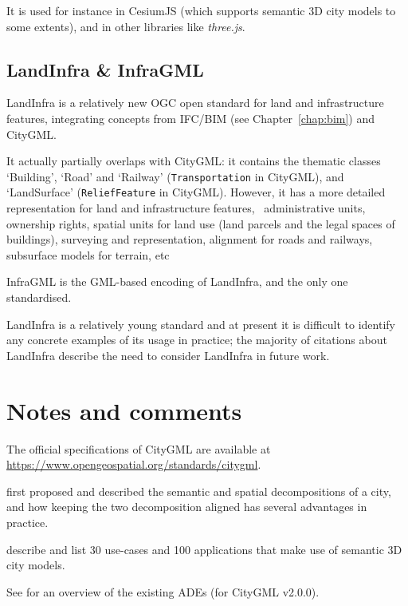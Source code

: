 It is used for instance in CesiumJS (which supports semantic 3D city models to some extents), and in other libraries like \emph{three.js}.



\subsection{LandInfra \& InfraGML}

LandInfra is a relatively new OGC open standard for land and infrastructure features, integrating concepts from IFC/BIM (see Chapter~\ref{chap:bim}) and CityGML\@.

It actually partially overlaps with CityGML: it contains the thematic classes `Building', `Road' and `Railway' (\texttt{Transportation} in CityGML), and `LandSurface' (\texttt{ReliefFeature} in CityGML). 
However, it has a more detailed representation for land and infrastructure features, \eg\ administrative units, ownership rights, spatial units for land use (land parcels and the legal spaces of buildings), surveying and representation, alignment for roads and railways, subsurface models for terrain, etc

InfraGML is the GML-based encoding of LandInfra, and the only one standardised.

LandInfra is a relatively young standard and at present it is difficult to identify any concrete examples of its usage in practice; the majority of citations about LandInfra describe the need to consider LandInfra in future work.


%
\section{Notes and comments}

The official specifications of CityGML are available at \url{https://www.opengeospatial.org/standards/citygml}.


\citep{Stadler07} first proposed and described the semantic and spatial decompositions of a city, and how keeping the two decomposition aligned has several advantages in practice.

\citet{Biljecki15a} describe and list 30 use-cases and 100 applications that make use of semantic 3D city models.

See \citet{Biljecki18} for an overview of the existing ADEs (for CityGML v2.0.0).

